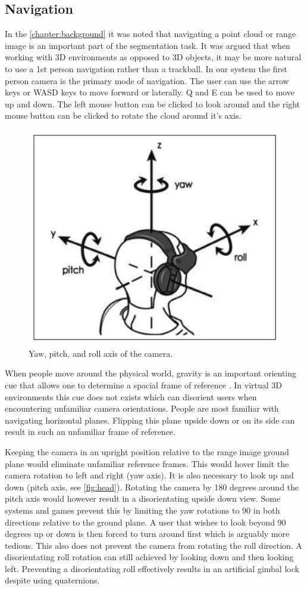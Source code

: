 \subsection{Navigation}
In the \autoref{chapter:background} it was noted that navigating a point cloud or range image is an important part of the segmentation task. It was argued that when working with 3D environments as opposed to 3D objects, it may be more natural to use a 1st person navigation rather than a trackball. In our system the first person camera is the primary mode of navigation. The user can use the arrow keys or WASD keys to move forward or laterally. Q and E can be used to move up and down. The left mouse button can be clicked to look around and the right mouse button can be clicked to rotate the cloud around it's axis.


\begin{figure}[ht]
  \centering
  \includegraphics[width=.5\linewidth]{images/head}
  \caption{Yaw, pitch, and roll axis of the camera. \protect\footnotemark[\value{footnote}]}
  \label{fig:head}
\end{figure}

When people move around the physical world, gravity is an important orienting cue that allows one to determine a spacial frame of reference \cite{Jeffery2011}. In virtual 3D environments this cue does not exists which can disorient users when encountering unfamiliar camera orientations. People are most familiar with navigating horizontal planes. Flipping this plane upside down or on its side can result in such an unfamiliar frame of reference.

Keeping the camera in an upright position relative to the range image ground plane would eliminate unfamiliar reference frames. This would hover limit the camera rotation to left and right (yaw axis). It is also necessary to look up and down (pitch axis, see \autoref{fig:head}). Rotating the camera by 180 degrees around the pitch axis would however result in a disorientating upside down view. Some systems and games prevent this by limiting the yaw rotations to 90 in both directions relative to the ground plane. A user that wishes to look beyond 90 degrees up or down is then forced to turn around first which is arguably more tedious. This also does not prevent the camera from rotating the roll direction. A disorientating roll rotation can still achieved by looking down and then looking left. Preventing a disorientating roll effectively results in an artificial gimbal lock \cite{Hanson2007} despite using quaternions.

